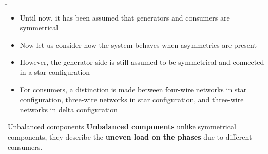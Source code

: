 \begin{frame}
    
    
    \b{
        \begin{itemize}
            \item Until now, it has been assumed that generators and consumers are symmetrical
            \item Now let us consider how the system behaves when asymmetries are present
            \item However, the generator side is still assumed to be symmetrical and connected in a star configuration
            \item For consumers, a distinction is made between four-wire networks in star configuration, three-wire networks in star configuration, and three-wire networks in delta configuration
        \end{itemize}
    }
\end{frame}

\begin{frame}
    
    \begin{Key point}{Unbalanced components}
        {\bf Unbalanced components} unlike symmetrical components, they describe the {\bf uneven load on the
            phases} due to different consumers. 
    \end{Key point}
\end{frame}


